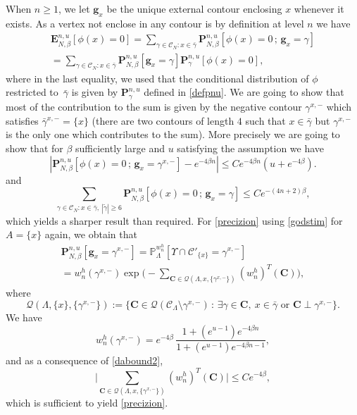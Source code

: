 \documentclass[JEP,XML,SOM,Unicode, NoFloatCountersInSection]{cedram}
\let\mathcal\mathscr
\newcommand{\sep}{\,:\,}
\numberwithin{equation}{section}
\theoremstyle{plain}
\theoremstyle{definition}
\newcommand{\bg}{\mathbf{g}}
\newcommand{\cQ}{{\ensuremath{\mathcal Q}} }
\newcommand{\cC}{{\ensuremath{\mathcal C}} }
\newcommand{\bP}{{\ensuremath{\mathbf P}} }
\newcommand{\bE}{{\ensuremath{\mathbf E}} }
\newcommand{\bC}{{\ensuremath{\mathbf C}} }
\newcommand{\bbP}{{\ensuremath{\mathbb P}} }
\newcommand{\gb}{\beta}
\newcommand{\gL}{\Lambda}
\begin{document}
When $n\ge 1$, we let $\bg_x$ be the unique external contour enclosing $x$ whenever it exists.
As a vertex not enclose in any contour is by definition at level $n$ we have
\begin{multline*}
\bE^{n,u}_{N,\gb}[ \phi(x)=0]= \sum_{\gamma\in \cC_N: x\in \bar \gamma} \bP^{n,u}_{N,\gb}\left[ \phi(x)=0\, ; \, \bg_x=\gamma \right]\\[-5pt]
=\sum_{\gamma\in \cC_N: x\in \bar \gamma} \bP^{n,u}_{N,\gb}\left[ \bg_x=\gamma \right]\bP^{n,u}_{\gamma}\left[ \phi(x)=0\right],
\end{multline*}
where in the last equality, we used that the conditional distribution of $\phi$ restricted to~$\bar \gamma$ is given by
$\bP^{n,u}_{\gamma}$ defined in \eqref{defpnu}. We are going to show that most of the contribution to the sum
is given by the negative contour $\gamma^{x,-}$ which satisfies $\bar \gamma^{x,-}=\{x\}$ (there are two contours of length $4$ such that $x\in \bar \gamma$ but
$\gamma^{x,-}$ is the only one which contributes to the sum).
More precisely we are going to show that for $\gb$ sufficiently large and $u$ satisfying the assumption we have
\begin{equation}\label{precizion}
\left| \bP^{n,u}_{N,\gb}\left[ \phi(x)=0\, ; \, \bg_x=\gamma^{x,-} \right]- e^{-4\gb n} \right|\le C e^{-4\gb n}\left(u+ e^{-4\gb}\right).
\end{equation}
and
\begin{equation}\label{pro}
\sum_{\gamma\in \cC_N: x\in \bar \gamma,\ |\tilde \gamma|\ge 6} \bP^{n,u}_{N,\gb}\left[ \phi(x)=0\, ; \, \bg_x=\gamma \right] \le C e^{-(4n+2)\gb},
\end{equation}
which yields a sharper result than required.
For \eqref{precizion}
using \eqref{godstim} for $A=\{x\}$ again, we obtain that
\begin{multline*}
\bP^{n,u}_{N,\gb}\left[ \bg_x=\gamma^{x,-}\right]= \bbP^{w^h_n}_{\gL}[\Upsilon \cap \cC'_{\{x\}}=\gamma^{x,-}]\\
=w^h_n(\gamma^{x,-})\exp\biggl(-\sum_{\bC\in \cQ(\gL,x,\{\gamma^{x,-}\})} (w^h_n)^T(\bC)\biggr),
\end{multline*}
where
\begin{equation*}
\cQ(\gL,\{x\},\{\gamma^{x,-}\}):=\{ \bC \in \cQ(\cC_{\gL}\setminus \gamma^{x,-}) \sep \exists \gamma \in \bC,\ x\in \bar \gamma \text{ or } \bC \perp \gamma^{x,-} \}.
\end{equation*}
We have\vspace*{-3pt}
\begin{equation*}
w^h_n(\gamma^{x,-})=e^{-4\gb}\,\frac{1+(e^{u-1})e^{-4\gb n}}{1+(e^{u-1})e^{-4\gb{n-1}}},
\end{equation*}
and as a consequence of \eqref{dabound2},\vspace*{-3pt}
\begin{equation*}
\biggl| \sum_{\bC\in \cQ(\gL,x,\{\gamma^{x,-}\})} (w^h_n)^T(\bC) \biggr| \le C e^{-4\gb},
\end{equation*}
which is sufficient to yield \eqref{precizion}.
\end{document}
